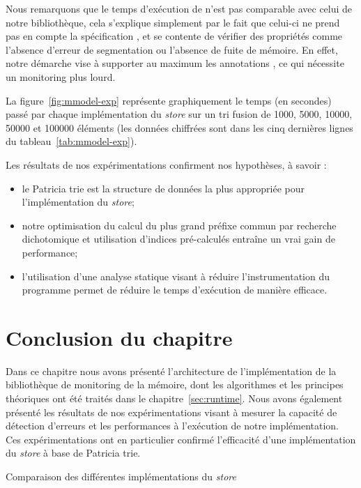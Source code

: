Nous remarquons que le temps d'exécution de \valgrind n'est pas comparable avec
celui de notre bibliothèque, cela s'explique simplement par le fait que celui-ci
ne prend pas en compte la spécification \eacsl, et se contente de vérifier des
propriétés comme l'absence d'erreur de segmentation ou l'absence de fuite de
mémoire.
En effet, notre démarche vise à supporter au maximum les annotations \eacsl,
ce qui nécessite un monitoring plus lourd.

La figure~\ref{fig:mmodel-exp} représente graphiquement le temps (en secondes)
passé par chaque implémentation du {\em store} sur un tri fusion de 1000, 5000,
10000, 50000 et 100000 éléments (les données chiffrées sont dans les cinq
dernières lignes du tableau~\ref{tab:mmodel-exp}).

Les résultats de nos expérimentations confirment nos hypothèses, à savoir :
\begin{itemize}
\item le Patricia trie est la structure de données la plus appropriée pour
  l'implémentation du {\em store};
\item notre optimisation du calcul du plus grand préfixe commun par recherche
  dichotomique et utilisation d'indices pré-calculés entraîne un vrai gain de
  performance;
\item l'utilisation d'une analyse statique visant à réduire l'instrumentation
  du programme permet de réduire le temps d'exécution de manière efficace.
\end{itemize}


\section*{Conclusion du chapitre}

Dans ce chapitre nous avons présenté l'architecture de l'implémentation de la
bibliothèque de monitoring de la mémoire, dont les algorithmes et les principes
théoriques ont été traités dans le chapitre~\ref{sec:runtime}.
Nous avons également présenté les résultats de nos expérimentations visant à
mesurer la capacité de détection d'erreurs et les performances à l'exécution de
notre implémentation.
Ces expérimentations ont en particulier confirmé l'efficacité d'une
implémentation du {\em store} à base de Patricia trie.


\begin{landscape}
  \begin{table}[h]
    \centering
    \begin{footnotesize}
      
    \end{footnotesize}
    \caption{Comparaison des différentes implémentations du {\em store}
      \label{tab:mmodel-exp}}
  \end{table}
\end{landscape}
